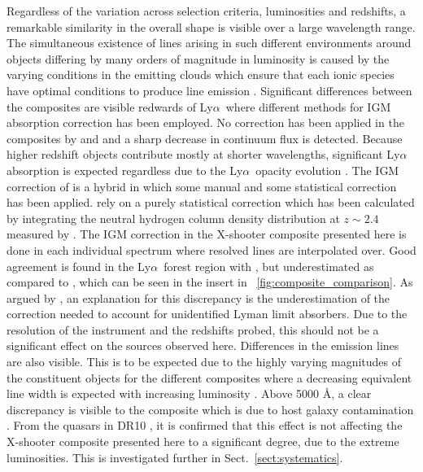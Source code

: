 \documentclass{aa}    %
\newcommand{\figref}[1]{\ref{fig:#1}}
\newcommand{\Fig}[1]{\figurename~\figref{#1}}
\newcommand{\fig}[1]{\Fig{#1}}
\newcommand{\sectionname}{Sect.}
\newcommand{\Sect}[1]{\sectionname~\ref{sect:#1}}
\newcommand{\sect}[1]{\Sect{#1}}
\newcommand{\lya}{Ly$\alpha$}
\begin{document}
Regardless of the variation across selection criteria, luminosities and
redshifts, a remarkable similarity in the overall shape is visible
over a large wavelength range. The simultaneous existence of lines
arising in such different environments around objects differing by
many orders of magnitude in luminosity is caused by the varying
conditions in the emitting clouds which ensure that each ionic species have
optimal conditions to produce line emission \citep{Baldwin1995}.
Significant differences between the composites are visible redwards of
\lya~where different methods for IGM absorption correction has been
employed. No correction has been applied in the composites by
\citet{Francis1991} and \citet{VandenBerk2001} and a sharp decrease in
continuum flux is detected. Because higher redshift objects contribute
mostly at shorter wavelengths, significant \lya~ absorption is
expected regardless due to the \lya~opacity evolution
\citep{Moller1990, Madau1995, DallAglio2008}. The IGM correction of
\citet{Telfer2002} is a hybrid in which some manual and some
statistical correction has been applied. \citet{Lusso2015} rely on a purely statistical correction which has been calculated
by integrating the neutral hydrogen column density distribution at $z
\sim 2.4$ measured by \cite{Prochaska2014b}. The IGM correction in the
X-shooter composite presented here is done in each individual spectrum
where resolved lines are interpolated over. Good agreement is found in
the \lya~forest region with \cite{Telfer2002}, but underestimated as
compared to \cite{Lusso2015}, which can be seen in the insert in
\fig{composite_comparison}. As argued by \cite{Lusso2015}, an
explanation for this discrepancy is the underestimation of the
correction needed to account for unidentified Lyman limit
absorbers. Due to the resolution of the instrument and the redshifts
probed, this should not be a significant effect on the sources
observed here.  Differences in the emission lines are also
visible. This is to be expected due to the highly varying magnitudes
of the constituent objects for the different composites where a
decreasing equivalent line width is expected with increasing
luminosity \citep{Baldwin1977}.  Above 5000 \AA, a clear discrepancy
is visible to the \citet{VandenBerk2001} composite which is due to
host galaxy contamination \citep{Glikman2006}. From the quasars in
DR10 \citep{Shen2011}, it is confirmed that this effect is not
affecting the X-shooter composite presented here to a significant
degree, due to the extreme luminosities. This is investigated further
in \sect{systematics}.
\end{document}
